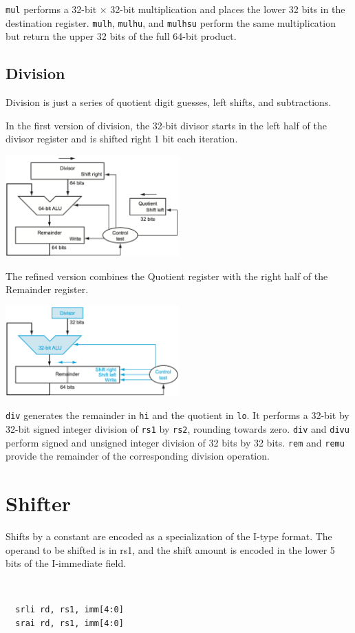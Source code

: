 \verb|mul| performs a 32-bit \(\times\) 32-bit multiplication and places the lower 32 bits in the destination register. \verb|mulh|, \verb|mulhu|, and \verb|mulhsu| perform the same multiplication but return the upper 32 bits of the full 64-bit product.

\subsection{Division}
Division is just a series of quotient digit guesses, left shifts, and subtractions.

In the first version of division, the 32-bit divisor starts in the left half of the divisor register and is shifted right 1 bit each iteration.
\begin{center}
  \includegraphics[width=0.5\textwidth]{Figure/div_1.png}
\end{center}

The refined version combines the Quotient register with the right half of the Remainder register.
\begin{center}
  \includegraphics[width=0.5\textwidth]{Figure/div_2.png}
\end{center}

\verb|div| generates the remainder in \verb|hi| and the quotient in \verb|lo|. It performs a 32-bit by 32-bit signed integer division of \verb|rs1| by \verb|rs2|, rounding towards zero. \verb|div| and \verb|divu| perform signed and unsigned integer division of 32 bits by 32 bits. \verb|rem| and \verb|remu| provide the remainder of the corresponding division operation.

\section{Shifter}
Shifts by a constant are encoded as a specialization of the I-type format. The operand to be shifted is in rs1, and the shift amount is encoded in the lower 5 bits of the I-immediate field.
\begin{codeBlock}~
\begin{verbatim}
  srli rd, rs1, imm[4:0]
  srai rd, rs1, imm[4:0]
\end{verbatim}
\end{codeBlock}

